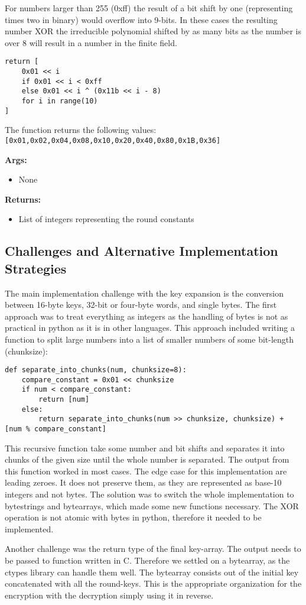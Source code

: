 For numbers larger than 255 (0xff) the result of a bit shift by one (representing times two in binary) would overflow into 9-bits. In these cases the resulting number XOR the irreducible polynomial shifted by as many bits as the number is over 8 will result in a number in the finite field.

\begin{lstlisting}
return [
    0x01 << i
    if 0x01 << i < 0xff
    else 0x01 << i ^ (0x11b << i - 8)
    for i in range(10)
]
\end{lstlisting}

The function returns the following values:
 \lstinline{[0x01,0x02,0x04,0x08,0x10,0x20,0x40,0x80,0x1B,0x36]}

\textbf{Args:}
\begin{itemize}
  \item None
\end{itemize}

\textbf{Returns:}
\begin{itemize}
  \item List of integers representing the round constants
\end{itemize}

\subsection{Challenges and Alternative Implementation Strategies}
The main implementation challenge with the key expansion is the conversion between 16-byte keys, 32-bit or four-byte words, and single bytes. The first approach was to treat everything as integers as the handling of bytes is not as practical in python as it is in other languages. This approach included writing a function to split large numbers into a list of smaller numbers of some bit-length (chunksize):
\begin{lstlisting}
def separate_into_chunks(num, chunksize=8):
    compare_constant = 0x01 << chunksize
    if num < compare_constant:
        return [num]
    else:
        return separate_into_chunks(num >> chunksize, chunksize) + [num % compare_constant]
\end{lstlisting}
This recursive function take some number and bit shifts and separates it into chunks of the given size until the whole number is separated. The output from this function worked in most cases. The edge case for this implementation are leading zeroes. It does not preserve them, as they are represented as base-10 integers and not bytes. The solution was to switch the whole implementation to bytestrings and bytearrays, which made some new functions necessary. The XOR operation is not atomic with bytes in python, therefore it needed to be implemented.

Another challenge was the return type of the final key-array. The output needs to be passed to function written in C. Therefore we settled on a bytearray, as the ctypes library can handle them well. The bytearray consists out of the initial key concatenated with all the round-keys. This is the appropriate organization for the encryption with the decryption simply using it in reverse.
